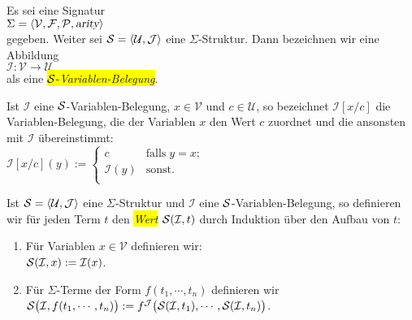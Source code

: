 \begin{Definition}
    Es sei eine  Signatur \\[0.2cm]
    \hspace*{1.3cm} $\Sigma = \langle \mathcal{V}, \mathcal{F}, \mathcal{P}, \textsl{arity} \rangle$ \\[0.2cm]
    gegeben.  Weiter sei $\mathcal{S} = \langle \mathcal{U}, \mathcal{J} \rangle$ eine $\Sigma$-Struktur.  Dann bezeichnen wir 
     eine Abbildung \\[0.2cm]
    \hspace*{1.3cm} $\mathcal{I}: \mathcal{V} \rightarrow \mathcal{U}$ \\[0.2cm]
    als eine     \colorbox{yellow}{$\mathcal{S}$-\emph{Variablen-Belegung}}.

    Ist $\mathcal{I}$ eine $\mathcal{S}$-Variablen-Belegung,
    $x \in \mathcal{V}$ und $c \in \mathcal{U}$, so bezeichnet $\mathcal{I}[x/c]$ die Variablen-Belegung, die 
    der Variablen $x$ den Wert $c$ zuordnet und die ansonsten mit $\mathcal{I}$ \"{u}bereinstimmt: \\[0.2cm]
    \hspace*{1.3cm} 
    $\mathcal{I}[x/c](y) := \left\{
    \begin{array}{ll}
    c               & \mbox{falls}\; y = x;  \\
    \mathcal{I}(y)  & \mbox{sonst}.          \\
    \end{array}
    \right.$ \eox
\end{Definition}

\begin{Definition}
    Ist $\struct = \pair(\mathcal{U},\mathcal{J})$ eine $\Sigma$-Struktur und $\mathcal{I}$ eine $\mathcal{S}$-Variablen-Belegung,
    so definieren wir f\"{u}r jeden Term $t$ den \colorbox{yellow}{\emph{Wert}} $\mathcal{S}(\mathcal{I}, t)$ durch Induktion \"{u}ber den Aufbau
    von $t$:
    \begin{enumerate}
    \item F\"{u}r Variablen $x \in \mathcal{V}$ definieren wir: \\[0.2cm]
          \hspace*{1.3cm} $\mathcal{S}(\mathcal{I}, x) := \mathcal{I}(x)$.
    \item F\"{u}r $\Sigma$-Terme der Form $f(t_1,\cdots,t_n)$ definieren wir \\[0.2cm]
          \hspace*{1.3cm} $\mathcal{S}\bigl(\mathcal{I}, f(t_1,\cdots,t_n)\bigr) := 
                           f^\mathcal{J}\bigl( \mathcal{S}(\mathcal{I}, t_1), \cdots, \mathcal{S}(\mathcal{I}, t_n) \bigr)$.
                           \eox
    \end{enumerate}
\end{Definition}

